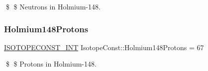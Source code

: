 \$ \$ Neutrons in Holmium-\/148. \mbox{\label{group___isotope_const-_holmium-_ho148_ga6c8b89f512480fbd06b2ae04ac3cf912}} 
\subsubsection{\texorpdfstring{Holmium148\+Protons}{Holmium148Protons}}
{\footnotesize\ttfamily \mbox{\hyperlink{group___isotope_const-_macros_ga5f18360b3e99483a35c32d789e62621c}{I\+S\+O\+T\+O\+P\+E\+C\+O\+N\+S\+T\+\_\+\+I\+NT}} Isotope\+Const\+::\+Holmium148\+Protons = 67}

\$ \$ Protons in Holmium-\/148. 